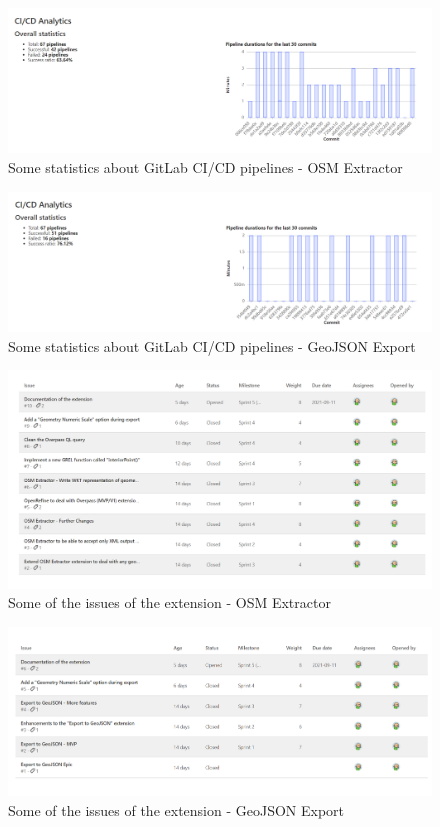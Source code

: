 \begin{figure}[H]
    \includegraphics[width=\linewidth]{./Figures/Appendices/gitlab_cicd_stats_osm_extractor}
    \caption{Some statistics about GitLab CI/CD pipelines - OSM Extractor}
\end{figure}
\begin{figure}[H]
    \includegraphics[width=\linewidth]{./Figures/Appendices/gitlab_cicd_stats_geojson_export}
    \caption{Some statistics about GitLab CI/CD pipelines - GeoJSON Export}
\end{figure}
\begin{figure}[H]
    \includegraphics[width=\linewidth]{./Figures/Appendices/gitlab_issues_osm_extractor}
    \caption{Some of the issues of the extension - OSM Extractor}
\end{figure}
\begin{figure}[H]
    \includegraphics[width=\linewidth]{./Figures/Appendices/gitlab_issues_geojson_export}
    \caption{Some of the issues of the extension - GeoJSON Export}
\end{figure}
